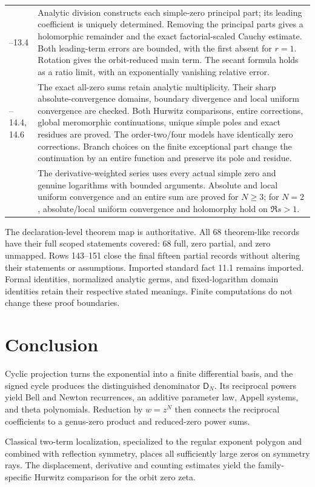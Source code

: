 \documentclass[11pt]{article}
\theoremstyle{definition}
\theoremstyle{remark}
\newcommand{\Dfun}{\mathsf D}
\begin{document}
\begin{longtable}{@{}>{\raggedright\arraybackslash}p{}>{\raggedright\arraybackslash}p{}@{}}
13.1--13.4 & Analytic division constructs each simple-zero principal part;
its leading coefficient is uniquely determined. Removing the principal parts
gives a holomorphic remainder and the exact factorial-scaled Cauchy estimate.
Both leading-term errors are bounded, with the first absent for $r=1$.
Rotation gives the orbit-reduced main term. The secant formula holds as a
ratio limit, with an exponentially vanishing relative error. \\
14.2--14.4, 14.6 & The exact all-zero sums retain analytic multiplicity.
Their sharp absolute-convergence domains, boundary divergence and local
uniform convergence are checked. Both Hurwitz comparisons, entire corrections,
global meromorphic continuations, unique simple poles and exact residues are
proved. The order-two/four models have identically zero corrections. Branch
choices on the finite exceptional part change the continuation by an entire
function and preserve its pole and residue. \\
14.8 & The derivative-weighted series uses every actual simple zero and genuine
logarithms with bounded arguments. Absolute and local uniform convergence and
an entire sum are proved for $N\geq3$; for $N=2$, absolute/local uniform
convergence and holomorphy hold on $\Re s>1$. \\
\bottomrule
\end{longtable}
\endgroup

The declaration-level theorem map is authoritative. All 68 theorem-like
records have their full scoped statements covered: 68 full, zero partial,
and zero unmapped. Rows 143--151 close the final fifteen partial records
without altering their statements or assumptions. Imported standard fact
11.1 remains imported. Formal identities, normalized analytic germs, and
fixed-logarithm domain identities retain their respective stated meanings.
Finite computations do not change these proof boundaries.

\section{Conclusion}\label{sec:conclusion}

Cyclic projection turns the exponential into a finite differential basis, and
the signed cycle produces the distinguished denominator $\Dfun_N$. Its
reciprocal powers yield Bell and Newton recurrences, an additive parameter
law, Appell systems, and theta polynomials. Reduction by $w=z^N$ then connects
the reciprocal coefficients to a genus-zero product and reduced-zero power
sums.

Classical two-term localization, specialized to the regular exponent polygon
and combined with reflection symmetry, places all sufficiently large zeros
on symmetry rays. The displacement, derivative and counting estimates yield
the family-specific Hurwitz comparison for the orbit zero zeta.

\begingroup
\small
\let\prscbibliography\thebibliography
\renewcommand{\thebibliography}[1]{\prscbibliography{#1}\setlength{\itemsep}{0pt}\setlength{\parsep}{0pt}}


\endgroup
\end{document}
